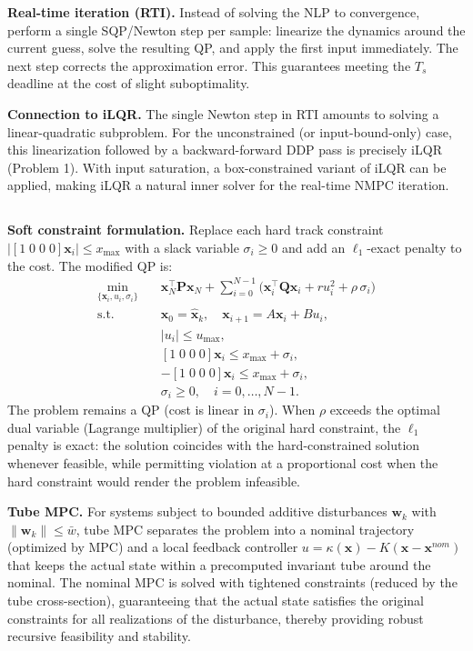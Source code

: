 \textbf{Real-time iteration (RTI).} Instead of solving the NLP to convergence, perform a single SQP/Newton step per sample: linearize the dynamics around the current guess, solve the resulting QP, and apply the first input immediately. The next step corrects the approximation error. This guarantees meeting the $T_s$ deadline at the cost of slight suboptimality.

\textbf{Connection to iLQR.} The single Newton step in RTI amounts to solving a linear-quadratic subproblem. For the unconstrained (or input-bound-only) case, this linearization followed by a backward-forward DDP pass is precisely iLQR (Problem 1). With input saturation, a box-constrained variant of iLQR can be applied, making iLQR a natural inner solver for the real-time NMPC iteration.

\subsection{}
\textbf{Soft constraint formulation.} Replace each hard track constraint $|[1\;0\;0\;0]\mathbf{x}_i| \leq x_{\max}$ with a slack variable $\sigma_i \geq 0$ and add an $\ell_1$-exact penalty to the cost. The modified QP is:
\begin{equation}
\begin{aligned}
    \min_{\{\mathbf{x}_i, u_i, \sigma_i\}} \quad & \mathbf{x}_N^\top\mathbf{P}\mathbf{x}_N + \sum_{i=0}^{N-1}\bigl(\mathbf{x}_i^\top\mathbf{Q}\mathbf{x}_i + ru_i^2 + \rho\,\sigma_i\bigr) \\
    \text{s.t.} \quad & \mathbf{x}_0 = \hat{\mathbf{x}}_k,\quad \mathbf{x}_{i+1} = A\mathbf{x}_i + Bu_i, \\
    & |u_i| \leq u_{\max}, \\
    & [1\;0\;0\;0]\mathbf{x}_i \leq x_{\max} + \sigma_i, \\
    & -[1\;0\;0\;0]\mathbf{x}_i \leq x_{\max} + \sigma_i, \\
    & \sigma_i \geq 0, \quad i = 0,\ldots,N-1.
\end{aligned}
\end{equation}
The problem remains a QP (cost is linear in $\sigma_i$). When $\rho$ exceeds the optimal dual variable (Lagrange multiplier) of the original hard constraint, the $\ell_1$ penalty is exact: the solution coincides with the hard-constrained solution whenever feasible, while permitting violation at a proportional cost when the hard constraint would render the problem infeasible.

\textbf{Tube MPC.} For systems subject to bounded additive disturbances $\mathbf{w}_k$ with $\|\mathbf{w}_k\| \leq \bar{w}$, tube MPC separates the problem into a nominal trajectory (optimized by MPC) and a local feedback controller $u = \kappa(\mathbf{x}) - K(\mathbf{x} - \mathbf{x}^{nom})$ that keeps the actual state within a precomputed invariant tube around the nominal. The nominal MPC is solved with tightened constraints (reduced by the tube cross-section), guaranteeing that the actual state satisfies the original constraints for all realizations of the disturbance, thereby providing robust recursive feasibility and stability.

